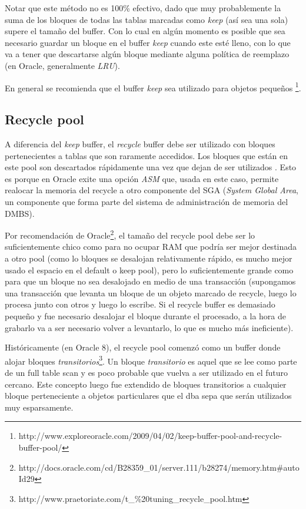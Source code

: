 Notar que este método no es 100\% efectivo, dado que muy probablemente la suma de los bloques de todas las tablas marcadas como \textit{keep} (así sea una sola) supere el tamaño del buffer. Con lo cual en algún momento es posible que sea necesario guardar un bloque en el buffer \textit{keep} cuando este esté lleno, con lo que va a tener que descartarse algún bloque mediante alguna política de reemplazo (en Oracle, generalmente \textit{LRU}). 

En general se recomienda que el buffer \textit{keep} sea utilizado para objetos pequeños \footnote{http://www.exploreoracle.com/2009/04/02/keep-buffer-pool-and-recycle-buffer-pool/}.

\subsection{Recycle pool}
A diferencia del \textit{keep} buffer, el \textit{recycle} buffer debe ser utilizado con bloques pertenecientes a tablas que son raramente accedidos. Los bloques que están en este pool son descartados rápidamente una vez que dejan de ser utilizados \footnotemark[\value{footnote}]. Esto es porque en Oracle exite una opción \textit{ASM} que, usada en este caso, permite realocar la memoria del recycle a otro componente del SGA (\textit{System Global Area}, un componente que forma parte del sistema de administración de memoria del DMBS).

Por recomendación de Oracle\footnote{http://docs.oracle.com/cd/B28359\_01/server.111/b28274/memory.htm\#autoId29}, el tamaño del recycle pool debe ser lo suficientemente chico como para no ocupar RAM que podría ser mejor destinada a otro pool (como lo bloques se desalojan relativamente rápido, es mucho mejor usado el espacio en el default o keep pool), pero lo suficientemente grande como para que un bloque no sea desalojado en medio de una transacción (supongamos una transacción que levanta un bloque de un objeto marcado de recycle, luego lo procesa junto con otros y luego lo escribe. Si el recycle buffer es demasiado pequeño y fue necesario desalojar el bloque durante el procesado, a la hora de grabarlo va a ser necesario volver a levantarlo, lo que es mucho más ineficiente).

Históricamente (en Oracle 8), el recycle pool comenzó como un buffer donde alojar bloques \textit{transitorios}\footnote{http://www.praetoriate.com/t\_\%20tuning\_recycle\_pool.htm}. Un bloque \textit{transitorio} es aquel que se lee como parte de un full table scan y es poco probable que vuelva a ser utilizado en el futuro cercano. Este concepto luego fue extendido de bloques transitorios a cualquier bloque perteneciente a objetos particulares que el dba sepa que serán utilizados muy esparsamente.
